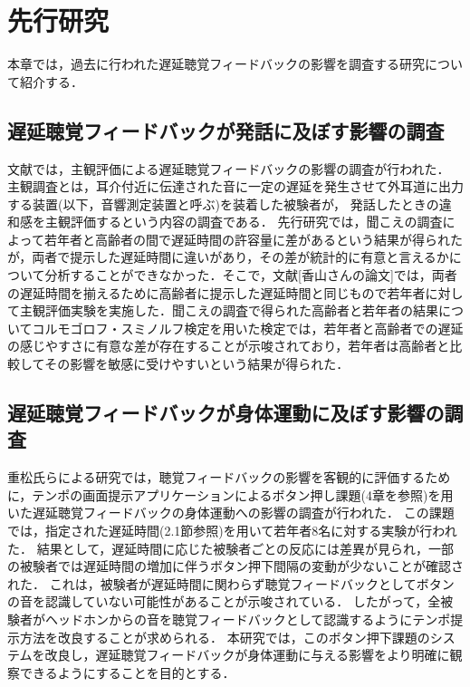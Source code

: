 \chapter{先行研究}
本章では，過去に行われた遅延聴覚フィードバックの影響を調査する研究について紹介する．
\section{遅延聴覚フィードバックが発話に及ぼす影響の調査}
文献\cite{kayama}では，主観評価による遅延聴覚フィードバックの影響の調査が行われた．
主観調査とは，耳介付近に伝達された音に一定の遅延を発生させて外耳道に出力する装置(以下，音響測定装置と呼ぶ)を装着した被験者が，
発話したときの違和感を主観評価するという内容の調査である．
先行研究\cite{kayama}では，聞こえの調査によって若年者と高齢者の間で遅延時間の許容量に差があるという結果が得られたが，両者で提示した遅延時間に違いがあり，その差が統計的に有意と言えるかについて分析することができなかった．そこで，文献[香山さんの論文]では，両者の遅延時間を揃えるために高齢者に提示した遅延時間と同じもので若年者に対して主観評価実験を実施した．聞こえの調査で得られた高齢者と若年者の結果についてコルモゴロフ・スミノルフ検定を用いた検定では，若年者と高齢者での遅延の感じやすさに有意な差が存在することが示唆されており，若年者は高齢者と比較してその影響を敏感に受けやすいという結果が得られた．
\section{遅延聴覚フィードバックが身体運動に及ぼす影響の調査}
重松氏らによる研究\cite{shigematu}では，聴覚フィードバックの影響を客観的に評価するために，テンポの画面提示アプリケーションによるボタン押し課題(4章を参照)を用いた遅延聴覚フィードバックの身体運動への影響の調査が行われた．
この課題では，指定された遅延時間(2.1節参照)を用いて若年者8名に対する実験が行われた．
結果として，遅延時間に応じた被験者ごとの反応には差異が見られ，一部の被験者では遅延時間の増加に伴うボタン押下間隔の変動が少ないことが確認された．
これは，被験者が遅延時間に関わらず聴覚フィードバックとしてボタンの音を認識していない可能性があることが示唆されている．
したがって，全被験者がヘッドホンからの音を聴覚フィードバックとして認識するようにテンポ提示方法を改良することが求められる．
本研究では，このボタン押下課題のシステムを改良し，遅延聴覚フィードバックが身体運動に与える影響をより明確に観察できるようにすることを目的とする．

